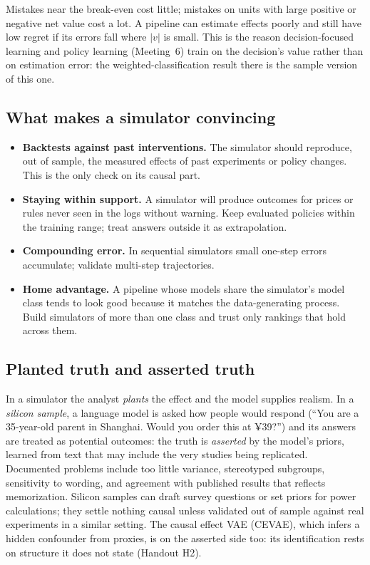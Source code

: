 \documentclass[11pt]{article}
\begin{document}
Mistakes near the break-even cost little; mistakes on units with large positive or negative net value cost a lot. A pipeline can
estimate effects poorly and still have low regret if its errors fall where $|v|$ is small. This is the reason decision-focused learning and policy learning (Meeting~6) train on the decision's value
rather than on estimation error: the weighted-classification result there is the sample version of this one.

\subsection{What makes a simulator convincing}

\begin{itemize}
  \item \textbf{Backtests against past interventions.} The simulator should reproduce, out of sample, the measured effects of past
  experiments or policy changes. This is the only check on its causal part.
  \item \textbf{Staying within support.} A simulator will produce outcomes for prices or rules never seen in the logs without warning.
  Keep evaluated policies within the training range; treat answers outside it as extrapolation.
  \item \textbf{Compounding error.} In sequential simulators small one-step errors accumulate; validate multi-step trajectories.
  \item \textbf{Home advantage.} A pipeline whose models share the simulator's model class tends to look good because it matches the
  data-generating process. Build simulators of more than one class and trust only rankings that hold across them.
\end{itemize}

\subsection{Planted truth and asserted truth}

In a simulator the analyst \emph{plants} the effect and the model supplies realism. In a \emph{silicon sample}, a language model is asked
how people would respond (``You are a 35-year-old parent in Shanghai. Would you order this at ¥39?'') and its answers are treated as
potential outcomes: the truth is \emph{asserted} by the model's priors, learned from text that may include the very studies being
replicated. Documented problems include too little variance, stereotyped subgroups, sensitivity to wording, and agreement with
published results that reflects memorization. Silicon samples can draft survey questions or set priors for power calculations; they
settle nothing causal unless validated out of sample against real experiments in a similar setting. The causal effect VAE (CEVAE),
which infers a hidden confounder from proxies, is on the asserted side too: its identification rests on structure it does not state
(Handout H2).
\end{document}
